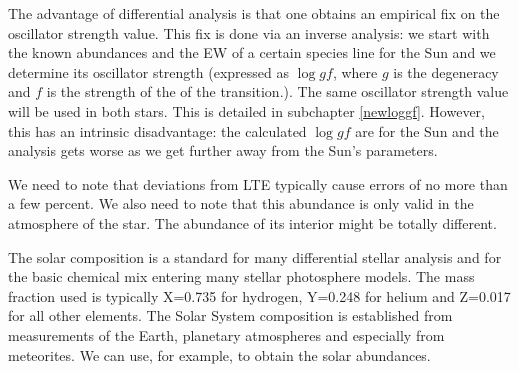 \documentclass[dvips,12pt,a4paper]{report}
\begin{document}
{The advantage of differential analysis is that one obtains an empirical fix on the oscillator strength value. This fix is done via an inverse analysis: we start with the known abundances and the EW of a certain species line for the Sun and we determine its oscillator strength (expressed as $\log gf$, where $g$ is the degeneracy and $f$ is the strength of the of the transition.). The same oscillator strength value will be used in both stars. This is detailed in subchapter \ref{newloggf}. However, this has an intrinsic disadvantage: the calculated $\log gf$ are for the Sun and the analysis gets worse as we get further away from the Sun's parameters. 

We need to note that deviations from LTE typically cause errors of no more than a few percent. We also need to note that this abundance is only valid in the atmosphere of the star. The abundance of its interior might be totally different.

The solar composition is a standard for many differential stellar analysis and for the basic chemical mix entering many stellar photosphere models. The mass fraction used is typically X=0.735 for hydrogen, Y=0.248 for helium and Z=0.017 for all other elements. The Solar System composition is established from measurements of the Earth, planetary atmospheres and especially from meteorites. We can use, for example, \citet{Anders-1989} to obtain the solar abundances.




}
\end{document}
